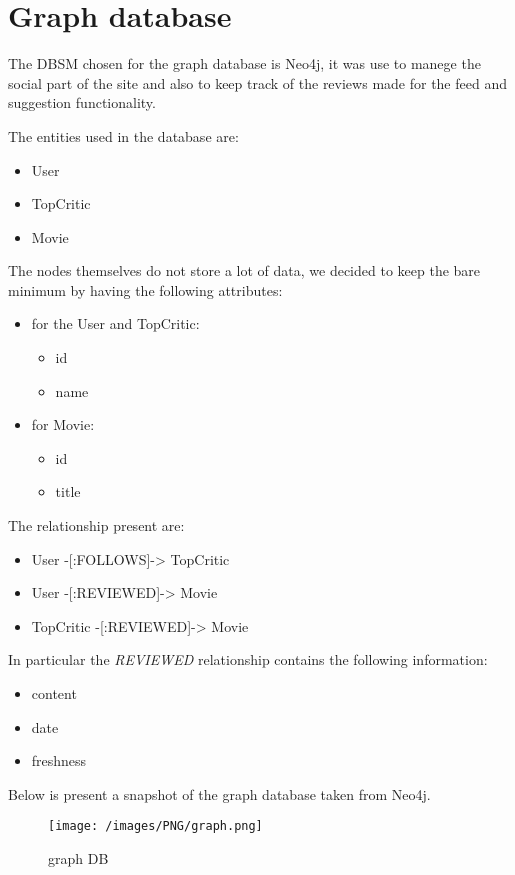%
%
\chapter{Graph database}
\justifying
The DBSM chosen for the graph database is Neo4j, it was use to manege the social part of the site and also to keep track of the reviews made for the feed and suggestion functionality.


The entities used in the database are:
\begin{itemize}
	\item User
	\item TopCritic
	\item Movie
\end{itemize}
The nodes themselves do not store a lot of data, we decided to keep the bare minimum by having the following attributes:
\begin{itemize}
	\item for the User and TopCritic:
	\begin{itemize}
		\item id
		\item name
	\end{itemize}
	\item for Movie:
	\begin{itemize}
		\item id
		\item title
	\end{itemize}
\end{itemize}
The relationship present are:
\begin{itemize}
	\item User -[:FOLLOWS]-> TopCritic
	\item User -[:REVIEWED]-> Movie
	\item TopCritic -[:REVIEWED]-> Movie
\end{itemize}
In particular the \emph{REVIEWED} relationship contains the following information:
\begin{itemize}
	\item content
	\item date
	\item freshness
\end{itemize}

Below is present a snapshot of the graph database taken from Neo4j.

\begin{figure}[H]
\begin{center}
\texttt{[image: /images/PNG/graph.png]}
\caption{graph DB}
\label{fig:graphDB}
\end{center}
\end{figure}

